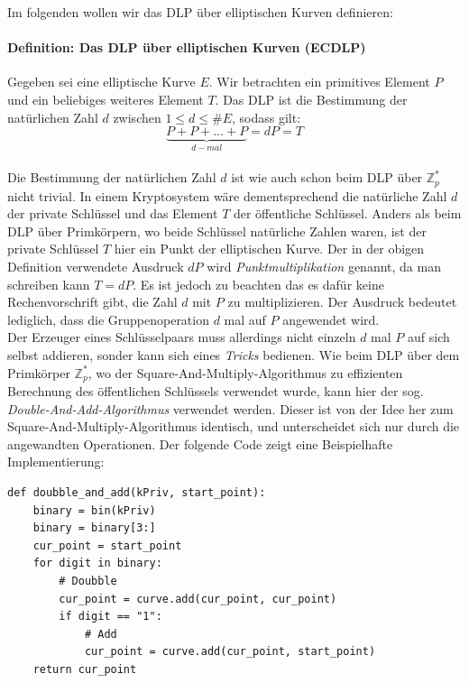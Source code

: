 Im folgenden wollen wir das DLP über elliptischen Kurven definieren:

\paragraph{Definition: Das DLP über elliptischen Kurven (ECDLP)}
Gegeben sei eine elliptische Kurve $E$. Wir betrachten ein primitives Element $P$ und ein beliebiges weiteres Element $T$. Das DLP ist die Bestimmung der natürlichen Zahl $d$ zwischen $1 \leq d \leq \#E$, sodass gilt:
$$\underbrace{P + P + \dots + P}_{d-mal} = d P = T$$\\

Die Bestimmung der natürlichen Zahl $d$ ist wie auch schon beim DLP über $\mathbb{Z}^*_p$ nicht trivial. In einem Kryptosystem wäre dementsprechend die natürliche Zahl $d$ der private Schlüssel und das Element $T$ der öffentliche Schlüssel. Anders als beim DLP über Primkörpern, wo beide Schlüssel natürliche Zahlen waren, ist der private Schlüssel $T$ hier ein Punkt der elliptischen Kurve. Der in der obigen Definition verwendete Ausdruck $dP$ wird \textit{Punktmultiplikation} genannt, da man schreiben kann $T = dP$. Es ist jedoch zu beachten das es dafür keine Rechenvorschrift gibt, die Zahl $d$ mit $P$ zu multiplizieren. Der Ausdruck bedeutet lediglich, dass die Gruppenoperation $d$ mal auf $P$ angewendet wird.\\

Der Erzeuger eines Schlüsselpaars muss allerdings nicht einzeln $d$ mal $P$ auf sich selbst addieren, sonder kann sich eines \textit{Tricks} bedienen. Wie beim DLP über dem Primkörper $\mathbb{Z}^*_p$, wo der Square-And-Multiply-Algorithmus zu effizienten Berechnung des öffentlichen Schlüssels verwendet wurde, kann hier der sog. \textit{Double-And-Add-Algorithmus} verwendet werden. Dieser ist von der Idee her zum Square-And-Multiply-Algorithmus identisch, und unterscheidet sich nur durch die angewandten Operationen. Der folgende Code zeigt eine Beispielhafte Implementierung:

\vspace{\baselineskip}
\begin{lstlisting}[caption={Double-And-Add-Algorithmus in Python}, captionpos=b]
def doubble_and_add(kPriv, start_point):
	binary = bin(kPriv)
	binary = binary[3:]
    cur_point = start_point
    for digit in binary:
        # Doubble
	    cur_point = curve.add(cur_point, cur_point)
		if digit == "1":
	        # Add
            cur_point = curve.add(cur_point, start_point)
    return cur_point
\end{lstlisting}
\vspace{\baselineskip}

